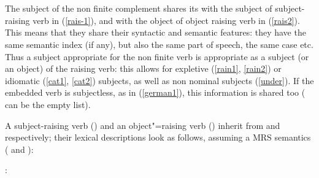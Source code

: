 \documentclass[output=paper
	        ,collection
	        ,collectionchapter
 	        ,biblatex
                ,babelshorthands
                ,newtxmath
                ,draftmode
                ,colorlinks, citecolor=brown
]{langscibook}
\begin{document}
\eal
\label{rsg}
\ex {} \impl\\
\avmtmp{ [ \argst  \1 \+ < [subj & \1 ] > ]} \label{rais-1}
\ex {}  \impl\\
\avmtmp{ [ \argst  < NP > \+ \1 \+ < [subj & \1 ] > ]} \label{rais2}
\zl


The subject of the non finite complement shares its  with the subject of subject-raising verb in (\ref{rais-1}), and with the object of object raising verb in (\ref{rais2}). This means that they share their syntactic and semantic features: they have the same semantic index (if any), but also the same part of speech, the same case etc. Thus a subject appropriate for the non finite verb is appropriate as a subject (or an object) of the raising verb: this allows for expletive (\ref{rain1}, \ref{rain2}) or idiomatic (\ref{cat1}, \ref{cat2}) subjects, as well as non nominal subjects (\ref{under}). If the embedded verb is subjectless, as in (\ref{german1}), this information is shared too ( can be the empty list).

A subject-raising verb () and an object"=raising verb () inherit from  and  respectively; their lexical descriptions look as follows, assuming a MRS semantics (\citealp{CFPS2005a} and ):

\eas
{}:\\
\zs
\end{document}
